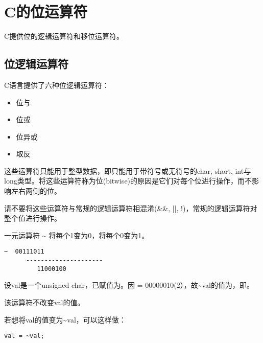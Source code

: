 \section{C的位运算符}
\begin{frame}

  C提供位的逻辑运算符和移位运算符。
\end{frame}
\subsection{位逻辑运算符}
\begin{frame}
  C语言提供了六种位逻辑运算符：
  \begin{itemize}
  \item 位与
  \item 位或
  \item 位异或
  \item 取反
  \end{itemize}
  这些运算符只能用于整型数据，即只能用于带符号或无符号的{\tf char, short, int}与{\tf long}类型。将这些运算符称为位{\tf (bitwise)}的原因是它们对每个位进行操作，而不影响左右两侧的位。
\end{frame}

\begin{frame}
  \begin{zhu}
    请不要将这些运算符与常规的逻辑运算符相混淆{\tf (\&\&, ||, !)}，常规的逻辑运算符对整个值进行操作。
  \end{zhu}
\end{frame}

\begin{frame}[fragile]
  
  一元运算符 {\tf \~{}} 将每个1变为0，将每个0变为1。
  \begin{li}
    \begin{lstlisting}[backgroundcolor=\color{red!20}]
      ~  00111011
      ---------------------
         11000100
    \end{lstlisting}
  \end{li}
\end{frame}


\begin{frame}[fragile]
  设{\tf val}是一个{\tf unsigned char}，已赋值为{}。因{ = 00000010(2）}，故{\tf \~{}val}的值为{}，即{}。

  \pause \vspace{.1in}
  
  \begin{zhu}
    该运算符不改变{\tf val}的值。

    若想将{\tf val}的值变为{\tf \~{}val}，可以这样做：
    \begin{lstlisting}[backgroundcolor=\color{red!20}]
      val = ~val;
    \end{lstlisting}
  \end{zhu}
\end{frame}



